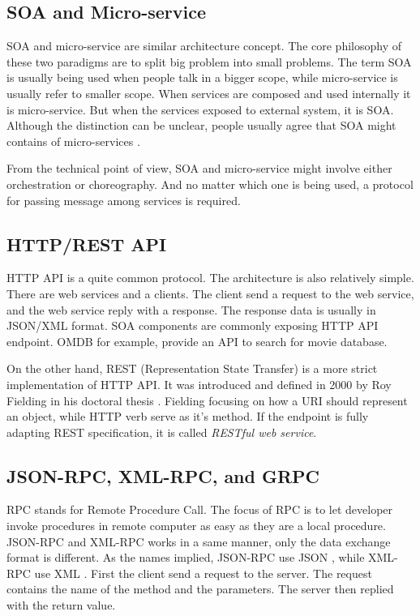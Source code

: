 \documentclass[conference]{IEEEtran}
\begin{document}
\subsection{SOA and Micro-service}

SOA and micro-service are similar architecture concept. The core philosophy of these two paradigms are to split big problem into small problems. The term SOA is usually being used when people talk in a bigger scope, while micro-service is usually refer to smaller scope. When services are composed and used internally it is micro-service. But when the services exposed to external system, it is SOA. Although the distinction can be unclear, people usually agree that SOA might contains of micro-services \cite{soavsmicroservice}.

From the technical point of view, SOA and micro-service might involve either orchestration or choreography. And no matter which one is being used, a protocol for passing message among services is required.

\subsection{HTTP/REST API}

HTTP API is a quite common protocol. The architecture is also relatively simple. There are web services and a clients. The client send a request to the web service, and the web service reply with a response. The response data is usually in JSON/XML format. SOA components are commonly exposing HTTP API endpoint. OMDB for example, provide an API to search for movie database.

On the other hand, REST (Representation State Transfer) is a more strict implementation of HTTP API. It was introduced and defined in 2000 by Roy Fielding in his doctoral thesis \cite{Fielding:2000:PDM:337180.337228}. Fielding focusing on how a URI should represent an object, while HTTP verb serve as it's method. If the endpoint is fully adapting REST specification, it is called {\it RESTful web service}.

\subsection{JSON-RPC, XML-RPC, and GRPC}

RPC stands for Remote Procedure Call. The focus of RPC is to let developer invoke procedures in remote computer as easy as they are a local procedure. JSON-RPC and XML-RPC works in a same manner, only the data exchange format is different. As the names implied, JSON-RPC use JSON \cite{jsonrpc}, while XML-RPC use XML \cite{xmlrpc}. First the client send a request to the server. The request contains the name of the method and the parameters. The server then replied with the return value.
\end{document}

